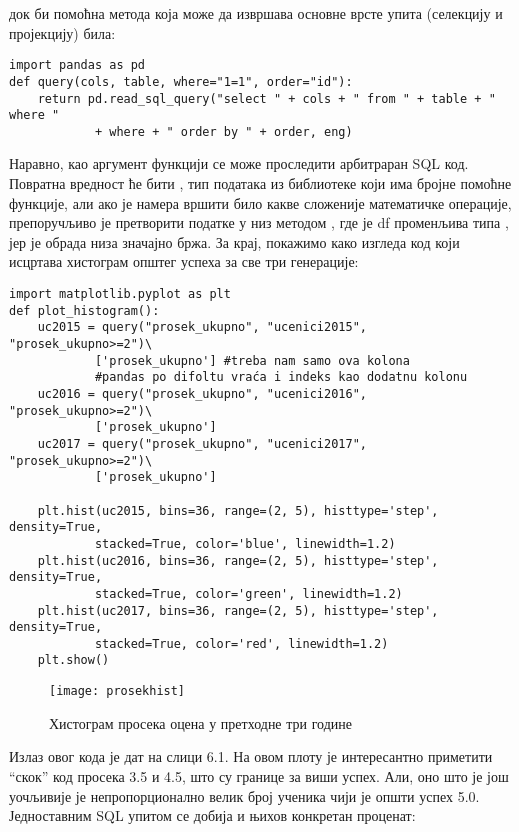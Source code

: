 док би помоћна метода која може да извршава основне врсте упита (селекцију и пројекцију) била:

\begin{verbatim}
import pandas as pd
def query(cols, table, where="1=1", order="id"):
    return pd.read_sql_query("select " + cols + " from " + table + " where " 
            + where + " order by " + order, eng)
\end{verbatim}

Наравно, као аргумент  функцији се може проследити арбитраран SQL код. Повратна вредност ће бити , тип података из  библиотеке који има бројне помоћне функције, али ако је намера вршити било какве сложеније математичке операције, препоручљиво је претворити податке у  низ методом , где је df променљива типа , јер је обрада низа значајно бржа. За крај, покажимо како изгледа код који исцртава хистограм општег успеха за све три генерације:

\begin{verbatim}
import matplotlib.pyplot as plt
def plot_histogram():
    uc2015 = query("prosek_ukupno", "ucenici2015", "prosek_ukupno>=2")\
            ['prosek_ukupno'] #treba nam samo ova kolona
            #pandas po difoltu vraća i indeks kao dodatnu kolonu
    uc2016 = query("prosek_ukupno", "ucenici2016", "prosek_ukupno>=2")\
            ['prosek_ukupno']
    uc2017 = query("prosek_ukupno", "ucenici2017", "prosek_ukupno>=2")\
            ['prosek_ukupno']

    plt.hist(uc2015, bins=36, range=(2, 5), histtype='step', density=True, 
            stacked=True, color='blue', linewidth=1.2)
    plt.hist(uc2016, bins=36, range=(2, 5), histtype='step', density=True, 
            stacked=True, color='green', linewidth=1.2)
    plt.hist(uc2017, bins=36, range=(2, 5), histtype='step', density=True, 
            stacked=True, color='red', linewidth=1.2)
    plt.show()
\end{verbatim}


\begin{figure}[h]
	\caption{Хистограм просека оцена у претходне три године}
	\centering
	\texttt{[image: prosekhist]}
\end{figure}


Излаз овог кода је дат на слици 6.1. На овом плоту је интересантно приметити \enquote{скок} код просека 3.5 и 4.5, што су границе за виши успех. Али, оно што је још уочљивије је непропорционално велик број ученика чији је општи успех 5.0. Једноставним SQL упитом се добија и њихов конкретан проценат:

